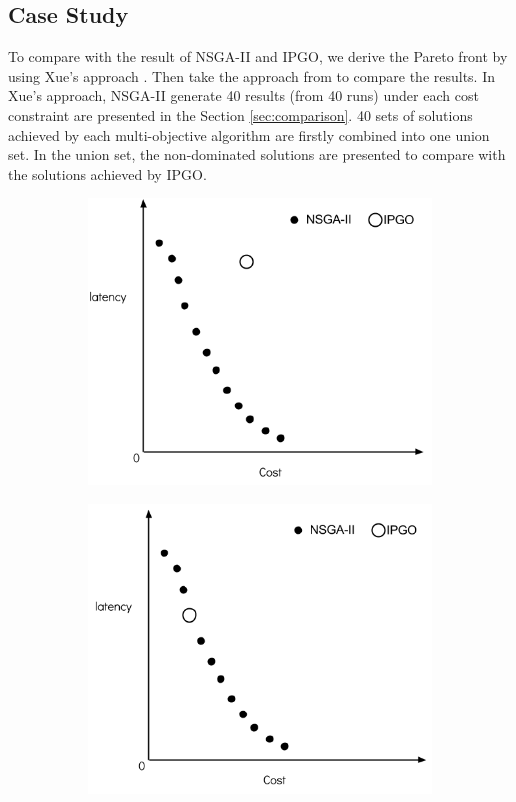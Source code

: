 \documentclass{llncs}
\begin{document}
\subsection{Case Study}
To compare with the result of NSGA-II and IPGO, we derive the Pareto front by using Xue's approach \cite{Xue}. Then take the approach from \cite{1688438} to 
compare the results.
In Xue's approach, NSGA-II generate 40 results (from 40 runs) under each cost constraint are presented in the Section \ref{sec:comparison}. 40 sets of solutions 
achieved by each multi-objective algorithm are firstly combined into one union set. In the union set, the non-dominated solutions 
are presented to compare with the solutions achieved by IPGO.

\begin{figure}[H]
	\centering
	\begin{subfigure}[b]{0.49\textwidth}
		\includegraphics[width=\textwidth]{pics/1.png}
		\caption{}
	\end{subfigure}
	\begin{subfigure}[b]{0.49\textwidth}
		\includegraphics[width=\textwidth]{pics/2.png}
		\caption{}
	\end{subfigure}



\end{figure}
\end{document}
